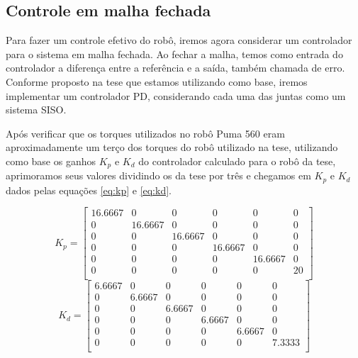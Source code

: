 \documentclass{article}
\begin{document}
\subsection{Controle em malha fechada}
Para fazer um controle efetivo do robô, iremos agora considerar um controlador para o sistema em malha fechada. Ao fechar a malha, temos como entrada do controlador a diferença entre a referência e a saída, também chamada de erro. Conforme proposto na tese\cite{bb:tese} que estamos utilizando como base, iremos implementar um controlador PD, considerando cada uma das juntas como um sistema SISO.

Após verificar que os torques utilizados no robô Puma 560 eram aproximadamente um terço dos torques do robô utilizado na tese\cite{bb:tese}, utilizando como base os ganhos $K_p$ e $K_d$ do controlador calculado para o robô da tese, aprimoramos seus valores dividindo os da tese por três e chegamos em $K_p$ e $K_d$ dados pelas equações \ref{eq:kp} e \ref{eq:kd}.

\begin{equation}
\label{eq:kp}
K_p=\begin{bmatrix}
16.6667 & 0 & 0 & 0 & 0 & 0\\
0 & 16.6667 & 0 & 0 & 0 & 0\\
0 & 0 & 16.6667 & 0 & 0 & 0\\
0 & 0 & 0 & 16.6667 & 0 & 0\\
0 & 0 & 0 & 0 & 16.6667 & 0\\
0 & 0 & 0 & 0 & 0 & 20\\
\end{bmatrix}
\end{equation}
\begin{equation}
\label{eq:kd}
K_d=\begin{bmatrix}
6.6667 & 0 & 0 & 0 & 0 & 0\\
0 & 6.6667 & 0 & 0 & 0 & 0\\
0 & 0 & 6.6667 & 0 & 0 & 0\\
0 & 0 & 0 & 6.6667 & 0 & 0\\
0 & 0 & 0 & 0 & 6.6667 & 0\\
0 & 0 & 0 & 0 & 0 & 7.3333\\
\end{bmatrix}
\end{equation}
\end{document}
